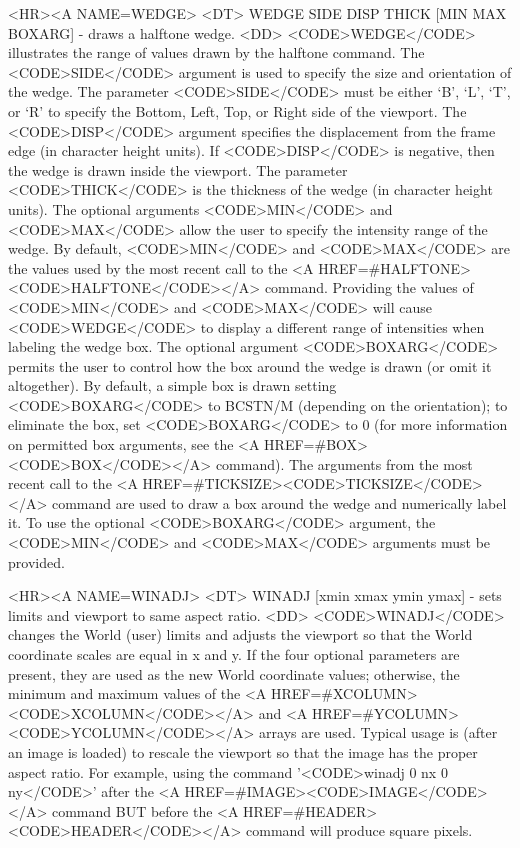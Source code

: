 \begin{rawhtml}
<HR><A NAME=WEDGE>
<DT>
WEDGE SIDE DISP THICK [MIN MAX BOXARG] - draws a halftone wedge.
<DD>
	<CODE>WEDGE</CODE> illustrates the range of values drawn by
	the halftone command.  The <CODE>SIDE</CODE> argument is
	used to specify the size and orientation of the wedge.
	The parameter <CODE>SIDE</CODE> must be either
	`B', `L', `T', or `R' to specify the Bottom, Left, Top, or Right
	side of the viewport.  The <CODE>DISP</CODE> argument specifies
	the displacement from the frame edge (in character height
	units).  If <CODE>DISP</CODE> is negative, then the wedge is
	drawn inside the viewport.  The parameter <CODE>THICK</CODE>
	is the thickness of the wedge (in character height units).
	The optional arguments <CODE>MIN</CODE> and <CODE>MAX</CODE>
	allow the user to specify the intensity range of the wedge.
	By default, <CODE>MIN</CODE> and <CODE>MAX</CODE> are the
	values used by the most recent call to the
	<A HREF=#HALFTONE><CODE>HALFTONE</CODE></A> command.
	Providing the values of <CODE>MIN</CODE> and <CODE>MAX</CODE>
	will cause <CODE>WEDGE</CODE> to display a different range
	of intensities when labeling the wedge box.  The optional
	argument <CODE>BOXARG</CODE> permits the user to control how
	the box around the wedge is drawn (or omit it altogether).
	By default, a simple box is drawn setting <CODE>BOXARG</CODE>
	to BCSTN/M (depending on the orientation); to eliminate the box,
	set <CODE>BOXARG</CODE> to 0 (for more information on permitted
	box arguments, see the <A HREF=#BOX><CODE>BOX</CODE></A> command).
	The arguments from the most recent call to the
	<A HREF=#TICKSIZE><CODE>TICKSIZE</CODE></A> command are used
	to draw a box around the wedge and numerically label it.
	To use the optional <CODE>BOXARG</CODE> argument, the
	<CODE>MIN</CODE> and <CODE>MAX</CODE> arguments must be provided.

<HR><A NAME=WINADJ>
<DT>
WINADJ [xmin xmax ymin ymax] - sets limits and viewport to same aspect ratio.
<DD>
	<CODE>WINADJ</CODE> changes the World (user) limits and
	adjusts the viewport so that the World coordinate scales are
	equal in x and y.  If the four optional parameters are present,
	they are used as the new World coordinate values; otherwise,
	the minimum and maximum values of the
	<A HREF=#XCOLUMN><CODE>XCOLUMN</CODE></A> and
	<A HREF=#YCOLUMN><CODE>YCOLUMN</CODE></A> arrays are used.
	Typical usage is (after an image is loaded) to rescale the
	viewport so that the image has the proper aspect ratio.
	For example, using the command '<CODE>winadj 0 nx 0 ny</CODE>'
	after the <A HREF=#IMAGE><CODE>IMAGE</CODE></A> command BUT
	before the <A HREF=#HEADER><CODE>HEADER</CODE></A> command
	will produce square pixels.


\end{rawhtml}
